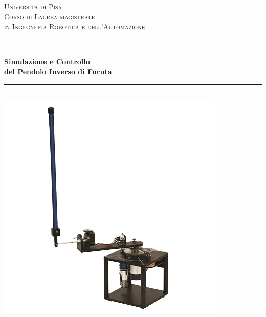 
\graphicspath{{./figs/}}

\title{}
\author{Francesco Petracci e Simone Silenzi} 



	
\begin{titlepage}
	\centering
	\vspace*{2 cm}
	\textsc{\Large Universit\`a di Pisa }\\[0.5 cm]							%
	\textsc{\large Corso di Laurea magistrale \\ 
		\vspace*{3mm} in Ingegneria Robotica e dell'Automazione}\\[1 cm]		%
	\rule{\linewidth}{0.2 mm} \\
	{ \Large{\textbf{Simulazione e Controllo \\ del Pendolo Inverso di Furuta}}}\\
	
	\rule{\linewidth}{0.2 mm} \\[2.5 cm]
	
	\includegraphics[height=.35\textheight]{quanser_furuta.png}
	

\end{titlepage}
